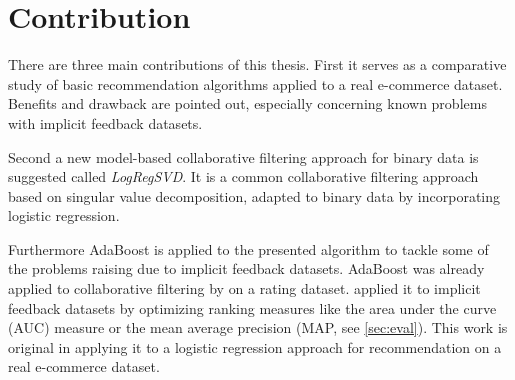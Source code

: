 \documentclass[10pt]{reportMaster}
\begin{document}
\section{Contribution}
There are three main contributions of this thesis.
First it serves as a comparative study of basic recommendation algorithms applied to a real e-commerce dataset.
Benefits and drawback are pointed out, especially concerning known problems with implicit feedback datasets.

Second a new model-based collaborative filtering approach for binary data is suggested called \textit{LogRegSVD}.
It is a common collaborative filtering approach based on singular value decomposition, adapted to binary data by incorporating logistic regression.

Furthermore AdaBoost is applied to the presented algorithm to tackle some of the problems raising due to implicit feedback datasets.
AdaBoost was already applied to collaborative filtering by \cite{boostingCFRatings} on a rating dataset.
\cite{boostingAUC} applied it to implicit feedback datasets by optimizing ranking measures like the area under the curve (AUC) measure or the mean average precision (MAP, see \ref{sec:eval}).
This work is original in applying it to a logistic regression approach for recommendation on a real e-commerce dataset.
\end{document}
